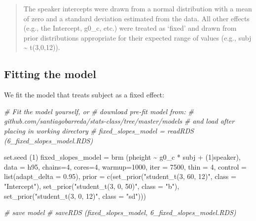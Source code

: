 \documentclass[
]{book}
\newenvironment{Shaded}{\begin{snugshade}}{\end{snugshade}}
\newcommand{\AttributeTok}[1]{\textcolor[rgb]{0.77,0.63,0.00}{#1}}
\newcommand{\CommentTok}[1]{\textcolor[rgb]{0.56,0.35,0.01}{\textit{#1}}}
\newcommand{\DecValTok}[1]{\textcolor[rgb]{0.00,0.00,0.81}{#1}}
\newcommand{\FloatTok}[1]{\textcolor[rgb]{0.00,0.00,0.81}{#1}}
\newcommand{\FunctionTok}[1]{\textcolor[rgb]{0.00,0.00,0.00}{#1}}
\newcommand{\NormalTok}[1]{#1}
\newcommand{\OtherTok}[1]{\textcolor[rgb]{0.56,0.35,0.01}{#1}}
\newcommand{\SpecialCharTok}[1]{\textcolor[rgb]{0.00,0.00,0.00}{#1}}
\newcommand{\StringTok}[1]{\textcolor[rgb]{0.31,0.60,0.02}{#1}}
\begin{document}
\begin{quote}
The speaker intercepts were drawn from a normal distribution with a mean of zero and a standard deviation estimated from the data. All other effects (e.g., the Intercept, g0\_c, etc.) were treated as `fixed' and drawn from prior distributions appropriate for their expected range of values (e.g., subj \textasciitilde{} t(3,0,12)).
\end{quote}

\hypertarget{fitting-the-model-6}{%
\subsection{Fitting the model}\label{fitting-the-model-6}}

We fit the model that treats subject as a fixed effect:

\begin{Shaded}
\begin{Highlighting}[]
\CommentTok{\# Fit the model yourself, or}
\CommentTok{\# download pre{-}fit model from: }
\CommentTok{\# github.com/santiagobarreda/stats{-}class/tree/master/models}
\CommentTok{\# and load after placing in working directory}
\CommentTok{\# fixed\_slopes\_model = readRDS (\textquotesingle{}6\_fixed\_slopes\_model.RDS\textquotesingle{})}

\FunctionTok{set.seed}\NormalTok{ (}\DecValTok{1}\NormalTok{)}
\NormalTok{fixed\_slopes\_model }\OtherTok{=}
  \FunctionTok{brm}\NormalTok{ (pheight }\SpecialCharTok{\textasciitilde{}}\NormalTok{ g0\_c }\SpecialCharTok{*}\NormalTok{ subj }\SpecialCharTok{+}\NormalTok{ (}\DecValTok{1}\SpecialCharTok{|}\NormalTok{speaker), }\AttributeTok{data =}\NormalTok{ h95, }\AttributeTok{chains=}\DecValTok{4}\NormalTok{, }\AttributeTok{cores=}\DecValTok{4}\NormalTok{,  }
       \AttributeTok{warmup=}\DecValTok{1000}\NormalTok{, }\AttributeTok{iter =} \DecValTok{7500}\NormalTok{, }\AttributeTok{thin =} \DecValTok{4}\NormalTok{, }\AttributeTok{control =} \FunctionTok{list}\NormalTok{(}\AttributeTok{adapt\_delta =} \FloatTok{0.95}\NormalTok{), }
       \AttributeTok{prior =} \FunctionTok{c}\NormalTok{(}\FunctionTok{set\_prior}\NormalTok{(}\StringTok{"student\_t(3, 60, 12)"}\NormalTok{, }\AttributeTok{class =} \StringTok{"Intercept"}\NormalTok{),}
                 \FunctionTok{set\_prior}\NormalTok{(}\StringTok{"student\_t(3, 0, 50)"}\NormalTok{, }\AttributeTok{class =} \StringTok{"b"}\NormalTok{),}
                 \FunctionTok{set\_prior}\NormalTok{(}\StringTok{"student\_t(3, 0, 12)"}\NormalTok{, }\AttributeTok{class =} \StringTok{"sd"}\NormalTok{)))}

\CommentTok{\# save model}
\CommentTok{\# saveRDS (fixed\_slopes\_model, \textquotesingle{}6\_fixed\_slopes\_model.RDS\textquotesingle{})}
\end{Highlighting}
\end{Shaded}
\end{document}
